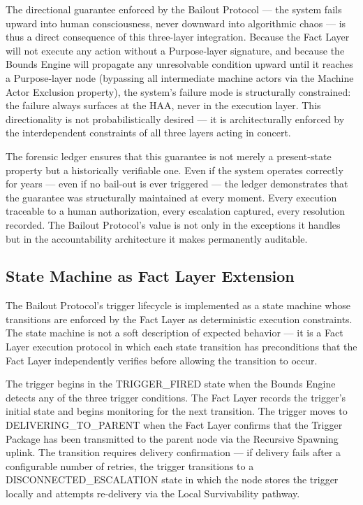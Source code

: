 The directional guarantee enforced by the Bailout Protocol — the system fails upward into human consciousness, never downward into algorithmic chaos — is thus a direct consequence of this three-layer integration. Because the Fact Layer will not execute any action without a Purpose-layer signature, and because the Bounds Engine will propagate any unresolvable condition upward until it reaches a Purpose-layer node (bypassing all intermediate machine actors via the Machine Actor Exclusion property), the system's failure mode is structurally constrained: the failure always surfaces at the HAA, never in the execution layer. This directionality is not probabilistically desired — it is architecturally enforced by the interdependent constraints of all three layers acting in concert.

The forensic ledger ensures that this guarantee is not merely a present-state property but a historically verifiable one. Even if the system operates correctly for years — even if no bail-out is ever triggered — the ledger demonstrates that the guarantee was structurally maintained at every moment. Every execution traceable to a human authorization, every escalation captured, every resolution recorded. The Bailout Protocol's value is not only in the exceptions it handles but in the accountability architecture it makes permanently auditable.

\subsection{State Machine as Fact Layer Extension}

The Bailout Protocol's trigger lifecycle is implemented as a state machine whose transitions are enforced by the Fact Layer as deterministic execution constraints. The state machine is not a soft description of expected behavior — it is a Fact Layer execution protocol in which each state transition has preconditions that the Fact Layer independently verifies before allowing the transition to occur.

The trigger begins in the TRIGGER\_FIRED state when the Bounds Engine detects any of the three trigger conditions. The Fact Layer records the trigger's initial state and begins monitoring for the next transition. The trigger moves to DELIVERING\_TO\_PARENT when the Fact Layer confirms that the Trigger Package has been transmitted to the parent node via the Recursive Spawning uplink. The transition requires delivery confirmation — if delivery fails after a configurable number of retries, the trigger transitions to a DISCONNECTED\_ESCALATION state in which the node stores the trigger locally and attempts re-delivery via the Local Survivability pathway.

